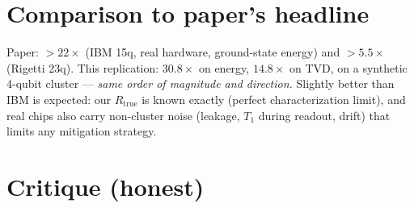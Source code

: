 \documentclass[11pt]{article}
\begin{document}
\section{Comparison to paper's headline}
Paper: $>22\times$ (IBM 15q, real hardware, ground-state energy) and $>5.5\times$
(Rigetti 23q). This replication: $30.8\times$ on energy, $14.8\times$ on TVD, on a
synthetic 4-qubit cluster --- \emph{same order of magnitude and direction.} Slightly
better than IBM is expected: our $R_\text{true}$ is known exactly (perfect
characterization limit), and real chips also carry non-cluster noise (leakage, $T_1$
during readout, drift) that limits any mitigation strategy.

\section{Critique (honest)}
\end{document}
